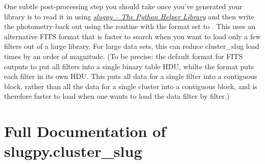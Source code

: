 \documentclass[letterpaper,10pt,english]{sphinxmanual}
\begin{document}
One subtle post-processing step you should take once you've generated your library is to read it in using {\hyperref[slugpy:sec\string-slugpy]{\emph{slugpy -- The Python Helper Library}}} and then write the photometry back out using the  routine with the format set to . This uses an alternative FITS format that is faster to search when you want to load only a few filters out of a large library. For large data sets, this can reduce cluster\_slug load times by an order of magnitude. (To be precise: the default format for FITS outputs to put all filters into a single binary table HDU, whilte the  format puts each filter in its own HDU. This puts all data for a single filter into a contiguous block, rather than all the data for a single cluster into a contiguous block, and is therefore faster to load when one wants to load the data filter by filter.)


\section{Full Documentation of slugpy.cluster\_slug}
\label{cluster_slug:ssec-cluster-slug-full}\label{cluster_slug:full-documentation-of-slugpy-cluster-slug}
\end{document}

